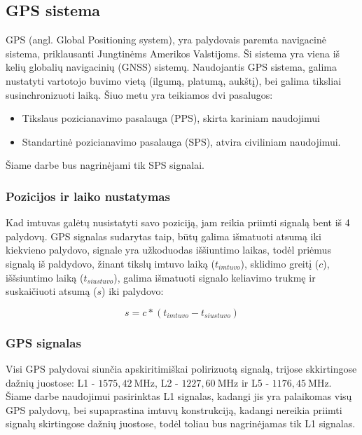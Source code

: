 \documentclass[main.tex]{subfiles}
\begin{document}
\subsection{GPS sistema}

GPS (angl. Global Positioning system), yra palydovais paremta navigacinė
sistema, priklausanti Jungtinėms Amerikos Valstijoms. Ši sistema yra viena
iš kelių globalių navigacinių (GNSS) sistemų. Naudojantis GPS sistema,
galima nustatyti vartotojo buvimo vietą (ilgumą, platumą, aukštį), bei
galima tiksliai susinchronizuoti laiką. Šiuo metu yra teikiamos dvi pasalugos:

\begin{itemize}
    \item Tikslaus pozicianavimo pasalauga (PPS)\cite{pps_standard}, skirta kariniam naudojimui
    \item Standartinė pozicianavimo pasalauga (SPS)\cite{sps_standard},
    atvira civiliniam naudojimui.
\end{itemize}

Šiame darbe bus nagrinėjami tik SPS signalai.

\subsubsection{Pozicijos ir laiko nustatymas}

Kad imtuvas galėtų nusistatyti savo poziciją, jam reikia priimti signalą bent
iš 4 palydovų. GPS signalas sudarytas taip, būtų galima išmatuoti atsumą iki
kiekvieno palydovo, signale yra užkoduodas iššiuntimo laikas, todėl priėmus
signalą iš paldydovo, žinant tikslų imtuvo laiką ($t_{imtuvo}$), sklidimo greitį ($c$),
iššsiuntimo laiką ($t_{siustuvo}$), galima išmatuoti signalo keliavimo trukmę ir suskaičiuoti
atsumą ($s$) iki palydovo:

\begin{equation}
    s = c * (t_{imtuvo} - t_{siustuvo})
\end{equation}

\subsubsection{GPS signalas}

Visi GPS palydovai siunčia apskiritimiškai polirizuotą signalą, trijose skkirtingose
dažnių juostose: L1 - $1575,42\ \mathrm{MHz}$, L2 - $1227,60\ \mathrm{MHz}$ ir
L5 - $1176,45\ \mathrm{MHz}$\cite{sps_standard}. Šiame darbe naudojimui pasirinktas
L1 signalas, kadangi jis yra palaikomas visų GPS palydovų, bei supaprastina imtuvų
konstrukciją, kadangi nereikia priimti signalų skirtingose dažnių juostose, todėl toliau
bus nagrinėjamas tik L1 signalas.
\end{document}
